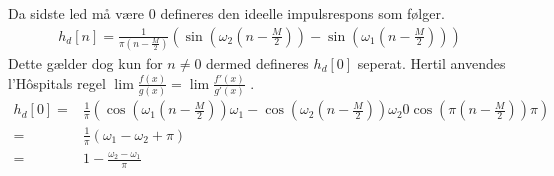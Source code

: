 Da sidste led må være $0$ defineres den ideelle impulsrespons som følger.
\begin{align}
h_d[n]= \frac{1}{\pi \left(n-\frac{M}{2}\right)} \left(\sin\left(\omega_2 \left(n-\frac{M}{2}\right)\right) - \sin\left(\omega_1 \left(n-\frac{M}{2}\right)\right)\right)
\end{align}
Dette gælder dog kun for $n \neq 0$ dermed defineres $h_d[0]$ seperat. Hertil anvendes l'Hôspitals regel $\lim \frac{f(x)}{g(x)}=\lim \frac{f'(x)}{g'(x)}$ .
\begin{align}
h_d[0]=& \frac{1}{\pi} \left( \cos\left( \omega_1\left(n-\frac{M}{2}\right) \right)\omega_1 - \cos\left( \omega_2\left(n-\frac{M}{2}\right) \right)\omega_2 0 \cos\left(\pi \left( n- \frac{M}{2}\right) \right) \pi \right) \\
=& \frac{1}{\pi}\left( \omega_1 - \omega_2 + \pi \right) \\
=& 1 - \frac{\omega_2-\omega_1}{\pi}
\end{align} 
 
 